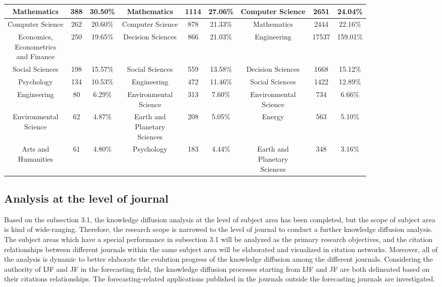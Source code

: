 \documentclass[11pt,a4paper]{elsarticle} %
\begin{document}
\begin{table}[H]
{\begin{tabular}{c c c|c c c|c c c}
    \hline
Mathematics & 388 & 30.50\% & Mathematics & 1114 & 27.06\% & Computer Science & 2651 & 24.04\%\\
    \hline
Computer Science & 262 & 20.60\% & Computer Science & 878 & 21.33\% & Mathematics & 2444 & 22.16\%\\
    \hline
\makecell[c]{Economics,\\ Econometrics \\ and Finance} & 250 & 19.65\% & Decision Sciences & 866 & 21.03\% & Engineering & 17537 & 159.01\%\\
    \hline
Social Sciences & 198 & 15.57\% & Social Sciences & 559 & 13.58\% & Decision Sciences & 1668 & 15.12\%\\
    \hline
Psychology & 134 & 10.53\% & Engineering & 472 & 11.46\% & Social Sciences & 1422 & 12.89\%\\
    \hline
Engineering & 80 & 6.29\% & \makecell[c]{Environmental\\Science} & 313 & 7.60\% & \makecell[c]{Environmental\\Science} & 734 & 6.66\%\\
    \hline
\makecell[c]{Environmental\\Science} & 62 & 4.87\% & \makecell[c]{Earth and\\Planetary\\Sciences} & 208 & 5.05\% & Energy & 563 & 5.10\%\\
    \hline
\makecell[c]{Arts and\\Humanities} & 61 & 4.80\% & Psychology & 183 & 4.44\% & \makecell[c]{Earth and\\ Planetary\\Sciences} & 348 & 3.16\%\\
    \hline
        \hline
    \end{tabular}}
\end{table}

\subsection{Analysis at the level of
journal}\label{analysis-at-the-level-of-journal}

Based on the subsection 3.1, the knowledge diffusion analysis at the
level of subject area has been completed, but the scope of subject area
is kind of wide-ranging. Therefore, the research scope is narrowed to
the level of journal to conduct a further knowledge diffusion analysis.
The subject areas which have a special performance in subsection 3.1
will be analyzed as the primary research objectives, and the citation
relationships between different journals within the same subject area
will be elaborated and visualized in citation networks. Moreover, all of
the analysis is dynamic to better elaborate the evolution progress of
the knowledge diffusion among the different journals. Considering the
authority of IJF and JF in the forecasting field, the knowledge
diffusion processes starting from IJF and JF are both delineated based
on their citations relationships. The forecasting-related applications
published in the journals outside the forecasting journals are
investigated.
\end{document}
